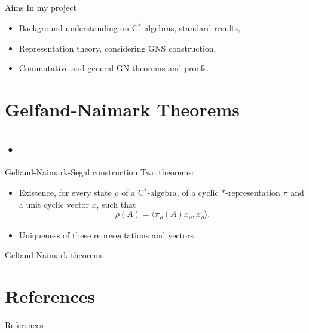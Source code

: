 \documentclass{beamer}
\begin{document}
\subsection{}
\begin{frame}{Aims} 
 In my project
 \begin{itemize}
 	\item Background understanding on C$^\ast$-algebras, standard results,	
 	\item Representation theory, considering GNS construction, 				
 	\item Commutative and general GN theorems and proofs.					
 \end{itemize}
\end{frame}



\section{Gelfand-Naimark Theorems}
\subsection{•}
\begin{frame}{Gelfand-Naimark-Segal construction}
 Two theorems:
 \begin{itemize}
 	\item Existence, for every state $\rho$ of a C$^\ast$-algebra, of a cyclic $\ast$-representation $\pi$ and a unit cyclic vector $x$, such that 
 		\[
 			\rho (A) = \langle \pi _{\rho} (A) x_{\rho}, x_{\rho} \rangle.
 		\]
 	\item Uniqueness of these representations and vectors.
 \end{itemize}
\end{frame}
 
\begin{frame}{Gelfand-Naimark theorems}
 
\end{frame}


\appendix{}
\section{References}
\begin{frame}{References}{}
 
\end{frame}
\end{document}
